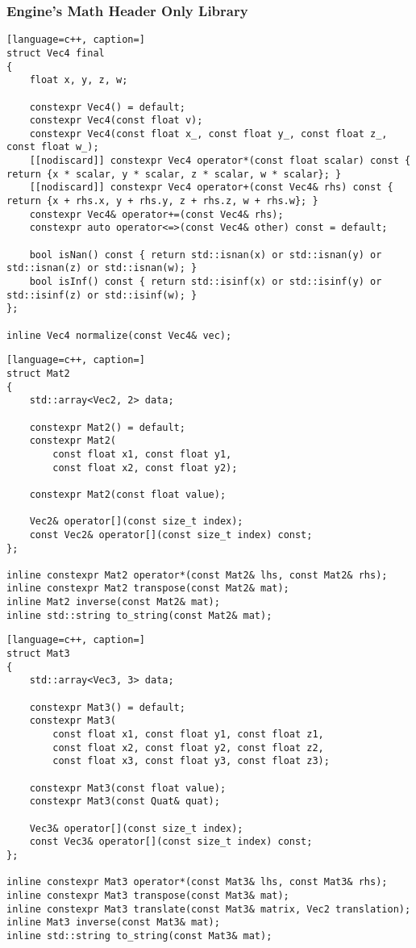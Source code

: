 \newpage

\subsubsection{Engine's Math Header Only Library}

\begin{lstlisting}[language=c++, caption=]
struct Vec4 final
{
    float x, y, z, w;

    constexpr Vec4() = default;
    constexpr Vec4(const float v);
    constexpr Vec4(const float x_, const float y_, const float z_, const float w_);
    [[nodiscard]] constexpr Vec4 operator*(const float scalar) const { return {x * scalar, y * scalar, z * scalar, w * scalar}; }
    [[nodiscard]] constexpr Vec4 operator+(const Vec4& rhs) const { return {x + rhs.x, y + rhs.y, z + rhs.z, w + rhs.w}; }
    constexpr Vec4& operator+=(const Vec4& rhs);
    constexpr auto operator<=>(const Vec4& other) const = default;

    bool isNan() const { return std::isnan(x) or std::isnan(y) or std::isnan(z) or std::isnan(w); }
    bool isInf() const { return std::isinf(x) or std::isinf(y) or std::isinf(z) or std::isinf(w); }
};

inline Vec4 normalize(const Vec4& vec);
\end{lstlisting}

\begin{lstlisting}[language=c++, caption=]
struct Mat2
{
    std::array<Vec2, 2> data;

    constexpr Mat2() = default;
    constexpr Mat2(
        const float x1, const float y1,
        const float x2, const float y2);

    constexpr Mat2(const float value);

    Vec2& operator[](const size_t index);
    const Vec2& operator[](const size_t index) const;
};

inline constexpr Mat2 operator*(const Mat2& lhs, const Mat2& rhs);
inline constexpr Mat2 transpose(const Mat2& mat);
inline Mat2 inverse(const Mat2& mat);
inline std::string to_string(const Mat2& mat);
\end{lstlisting}

\begin{lstlisting}[language=c++, caption=]
struct Mat3
{
    std::array<Vec3, 3> data;

    constexpr Mat3() = default;
    constexpr Mat3(
        const float x1, const float y1, const float z1,
        const float x2, const float y2, const float z2,
        const float x3, const float y3, const float z3);

    constexpr Mat3(const float value);
    constexpr Mat3(const Quat& quat);

    Vec3& operator[](const size_t index);
    const Vec3& operator[](const size_t index) const;
};

inline constexpr Mat3 operator*(const Mat3& lhs, const Mat3& rhs);
inline constexpr Mat3 transpose(const Mat3& mat);
inline constexpr Mat3 translate(const Mat3& matrix, Vec2 translation);
inline Mat3 inverse(const Mat3& mat);
inline std::string to_string(const Mat3& mat);
\end{lstlisting}

